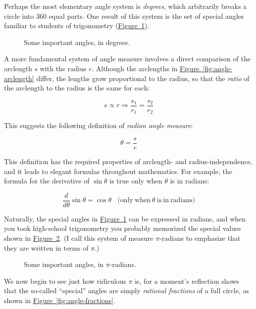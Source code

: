 \documentclass{article}
\begin{document}
Perhaps the most elementary angle system is \emph{degrees}, which arbitrarily breaks a circle into 360 equal parts. One result of this system is the set of special angles familiar to students of trigonometry (\hyperref[fig:degree-angles]{Figure~}\ref{fig:degree-angles}). 

\begin{figure}
\begin{center}
\end{center}
\caption{Some important angles, in degrees.\label{fig:degree-angles}}
\end{figure}

A more fundamental system of angle measure involves a direct comparison of the arclength $s$ with the radius $r$. Although the arclengths in \hyperref[fig:angle-arclength]{Figure~}\ref{fig:angle-arclength} differ, the lengths grow proportional to the radius, so that the \emph{ratio} of the arclength to the radius is the same for each:

\[
s\propto r \Rightarrow \frac{s_1}{r_1} = \frac{s_2}{r_2}
\]

\noindent This suggests the following definition of \emph{radian angle measure}:

\[ \theta = \frac{s}{r} \]

\noindent This definition has the required properties of arclength- and radius-independence, and it leads to elegant formulas throughout mathematics. For example, the formula for the derivative of $\sin\theta$ is true only when $\theta$ is in radians:

\[
  \frac{d}{d\theta}\sin\theta = \cos\theta \mathrm{\ \ \ \ (only\ when\ } \theta\mathrm{\ is\ in\ radians)}
\]

Naturally, the special angles in \hyperref[fig:degree-angles]{Figure~}\ref{fig:degree-angles} can be expressed in radians, and when you took high-school trigonometry you probably memorized the special values shown in \hyperref[fig:pi-angles]{Figure~}\ref{fig:pi-angles}. (I call this system of measure $\pi$-radians to emphasize that they are written in terms of $\pi$.)

\begin{figure}
\begin{center}
\end{center}
\caption{Some important angles, in $\pi$-radians.\label{fig:pi-angles}}
\end{figure}

\noindent We now begin to see just how ridiculous $\pi$ is, for a moment's reflection shows that the so-called ``special'' angles are simply  \emph{rational fractions} of a full circle, as shown in \hyperref[fig:angle-fractions]{Figure~}\ref{fig:angle-fractions}.
\end{document}
